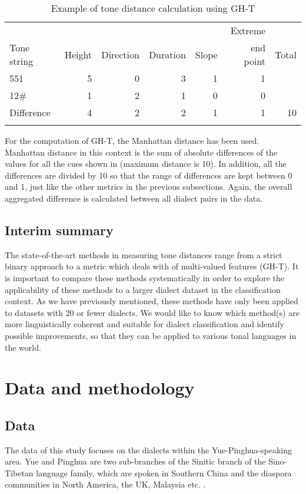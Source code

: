 \documentclass[output=paper, chinesefont]{langscibook}
\begin{document}
\begin{table}
\begin{tabular}{lrrrrrr}
\lsptoprule
              &          &             &            &         &  Extreme    & \\
{Tone string} & {Height} & {Direction} & {Duration} & {Slope} & {end point} & {Total}\\\midrule
551 & 5 & 0 & 3 & 1 & 1 & \\
12\# & 1 & 2 & 1 & 0 & 0 & \\
Difference & 4 & 2 & 2 & 1 & 1 & 10\\
\lspbottomrule
\end{tabular}
\caption{Example of tone distance calculation using GH-T}
\label{tab:sung:6}
\end{table}

For the computation of GH-T, the Manhattan distance has been used. Manhattan distance in this context is the sum of absolute differences of the values for all the cues shown in  (maximum distance is 10). In addition, all the differences are divided by 10 so that the range of differences are kept between 0 and 1, just like the other metrics in the previous subsections. Again, the overall aggregated difference is calculated between all dialect pairs in the data.

\subsection{Interim summary}
\label{sec:sung:3.6}
The state-of-the-art methods in measuring tone distances range from a strict binary approach to a metric which deals with of multi-valued features (GH-T). It is important to compare these methods systematically in order to explore the applicability of these methods to a larger dialect dataset in the classification context. As we have previously mentioned, these methods have only been applied to datasets with 20 or fewer dialects. We would like to know which method(s) are more linguistically coherent and suitable for dialect classification and identify possible improvements, so that they can be applied to various tonal languages in the world.

\section{Data and methodology}
\label{sec:sung:4}
\subsection{Data}
\label{sec:sung:4.1}
The data of this study focuses on the dialects within the Yue-Pinghua-speaking area. Yue and Pinghua are two sub-branches of the Sinitic branch of the Sino-Tibetan language family, which are spoken in Southern China and the diaspora communities in North America, the UK, Malaysia etc. \citep{Wu2012Yue}.
\end{document}

